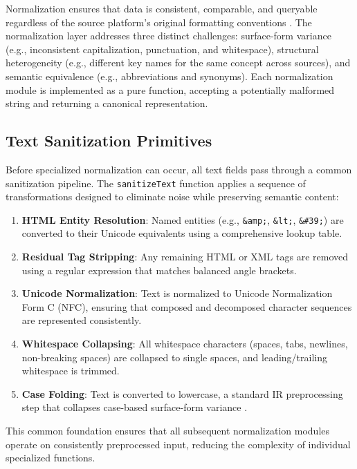 Normalization ensures that data is consistent, comparable, and queryable regardless of the source platform's original formatting conventions \cite{manning2008introduction}. The normalization layer addresses three distinct challenges: surface-form variance (e.g., inconsistent capitalization, punctuation, and whitespace), structural heterogeneity (e.g., different key names for the same concept across sources), and semantic equivalence (e.g., abbreviations and synonyms). Each normalization module is implemented as a pure function, accepting a potentially malformed string and returning a canonical representation.

\subsection{Text Sanitization Primitives}

Before specialized normalization can occur, all text fields pass through a common sanitization pipeline. The \texttt{sanitizeText} function applies a sequence of transformations designed to eliminate noise while preserving semantic content:

\begin{enumerate}
    \item \textbf{HTML Entity Resolution}: Named entities (e.g., \texttt{\&amp;}, \texttt{\&lt;}, \texttt{\&\#39;}) are converted to their Unicode equivalents using a comprehensive lookup table.
    \item \textbf{Residual Tag Stripping}: Any remaining HTML or XML tags are removed using a regular expression that matches balanced angle brackets.
    \item \textbf{Unicode Normalization}: Text is normalized to Unicode Normalization Form C (NFC), ensuring that composed and decomposed character sequences are represented consistently.
    \item \textbf{Whitespace Collapsing}: All whitespace characters (spaces, tabs, newlines, non-breaking spaces) are collapsed to single spaces, and leading/trailing whitespace is trimmed.
    \item \textbf{Case Folding}: Text is converted to lowercase, a standard IR preprocessing step that collapses case-based surface-form variance \cite{manning2008introduction}.
\end{enumerate}

This common foundation ensures that all subsequent normalization modules operate on consistently preprocessed input, reducing the complexity of individual specialized functions.

